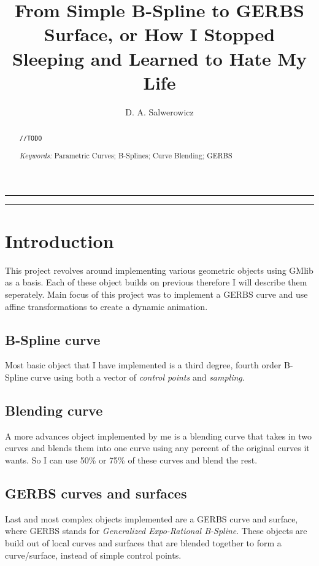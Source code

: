 \documentclass[a4paper,12pt]{extarticle}
\title{From Simple B-Spline to GERBS Surface, or How I Stopped Sleeping and Learned to Hate My Life}
\author{D. A. Salwerowicz}
\date{\parbox{\linewidth}{\centering
    \textit{\small UiT - The Arctic University of Norway, P.O. Box 385, N-8505 Narvik, Norway}\endgraf\bigskip
    \small Submitted \today
}}
\providecommand{\keywords}[1]{\flushleft\textit{\small{Keywords:}} #1}
\begin{document}
  
\maketitle

\noindent\rule{\linewidth}{.5pt}
\begin{abstract} 
\verb|//TODO|

\keywords{Parametric Curves; B-Splines; Curve Blending; GERBS}
\end{abstract}
\rule{\linewidth}{.5pt}


\section{Introduction}
This project revolves around implementing various geometric objects using GMlib as a basis. Each of these object builds on previous therefore I will describe them seperately. Main focus of this project was to implement a GERBS curve and use affine transformations to create a dynamic animation.

\subsection{B-Spline curve}
Most basic object that I have implemented is a third degree, fourth order B-Spline curve using both a vector of \emph{control points} and \emph{sampling}.

\subsection{Blending curve}
A more advances object implemented by me is a blending curve that takes in two curves and blends them into one curve using any percent of the original curves it wants. So I can use 50\% or 75\% of these curves and blend the rest.

\subsection{GERBS curves and surfaces}
Last and most complex objects implemented are a GERBS curve and surface, where GERBS stands for \emph{Generalized Expo-Rational B-Spline}. These objects are build out of local curves and surfaces that are blended together to form a curve/surface, instead of simple control points.
\end{document}
